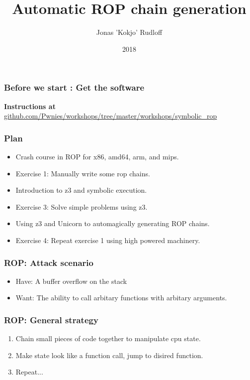 \documentclass{beamer}
\title{Automatic ROP chain generation}
\author{Jonas 'Kokjo' Rudloff }
\institute{Pwnies @ Copenhagen University}
\date{2018}
\begin{document}
\frame{\titlepage}


\begin{frame}
    \frametitle{Before we start : Get the software}
    \textbf{Instructions at} \\
    {\small \url{github.com/Pwnies/workshops/tree/master/workshops/symbolic\_rop}}
\end{frame}


\begin{frame}
    \frametitle{Plan}
    \begin{itemize}
        \item Crash course in ROP for x86, amd64, arm, and mips.
        \item Exercise 1: Manually write some rop chains.
        \item Introduction to z3 and symbolic execution.
        \item Exercise 3: Solve simple problems using z3.
        \item Using z3 and Unicorn to automagically generating ROP chains.
        \item Exercise 4: Repeat exercise 1 using high powered machinery.
    \end{itemize}
\end{frame}


\begin{frame}
    \frametitle{ROP: Attack scenario}
    \begin{itemize}
        \pause \item Have: A buffer overflow on the stack
        \pause \item Want: The ability to call arbitary functions with arbitary arguments.
    \end{itemize}
\end{frame}


\begin{frame}
    \frametitle{ROP: General strategy}
    \begin{enumerate}
        \pause \item Chain small pieces of code together to manipulate cpu state.
        \pause \item Make state look like a function call, jump to disired function.
        \pause \item Repeat...
    \end{enumerate}
\end{frame}
\end{document}
